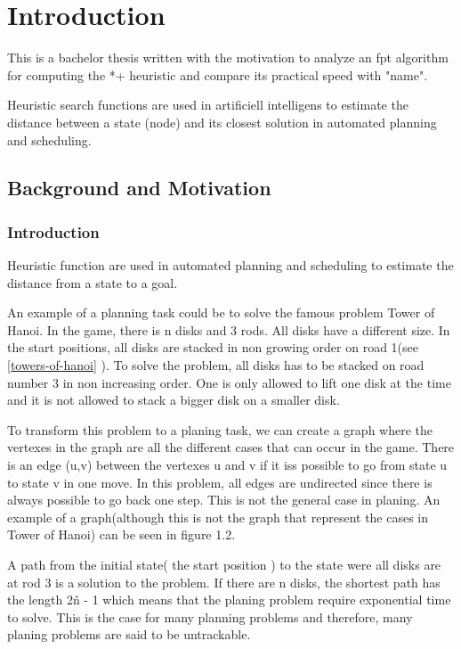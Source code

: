 \documentclass[cropmarks, frame, english]{idamasterthesis}
\author{Lars Niclas Jonsson}
\date{October 8, 1992}
\begin{document}

\makeintropages

\chapter{Introduction}
This is a bachelor thesis written with the motivation to analyze an fpt algorithm for computing the *+ heuristic and compare its practical speed with "name".

Heuristic search functions are used in artificiell intelligens  to estimate the distance between a state (node) and its closest solution in automated planning and scheduling.
\section{Background and Motivation}

\subsection{Introduction}

Heuristic function are used in automated planning and scheduling to estimate the distance from a state to a goal.

An example of a planning task could be to solve the famous problem Tower of Hanoi. In the game, there is n disks and 3 rods. All disks have a different size. In the start positions, all disks are stacked in non growing order on road 1(see \ref{towers-of-hanoi} ). To solve the problem, all disks has to be stacked on road number 3 in non increasing  order. One is only allowed to lift one disk at the time and it is  not allowed to stack a bigger disk on a smaller disk.

To transform this problem to a planing task, we can create a graph where the vertexes in the graph are all the different cases that can occur in the game. There is an edge (u,v) between the vertexes u and v if it iss possible to go from state u to state v in one move. In this problem, all edges are undirected since there is always possible to go back one step. This is not the general case in planing. An example of a graph(although this is not the graph that represent the cases in Tower of Hanoi) can be seen in figure 1.2.

A path from the initial state( the start position ) to the state were all disks are at rod 3 is a solution to the problem.
If there are n disks, the shortest path has the length 2\^ n - 1 which means that the planing problem require exponential time to solve. This is the case for many planning problems and therefore, many planing problems are said to be untrackable.
\end{document}
